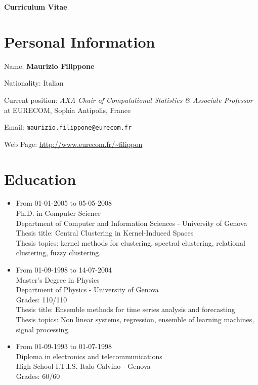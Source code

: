 \documentclass[a4paper,10pt]{article}
\begin{document}
\begin{center}
{\bf \LARGE Curriculum Vitae}
\end{center}

\section*{Personal Information}
\begin{description}
\item Name:               {\bf Maurizio Filippone}
\item Nationality:        Italian
\item Current position:
{\em AXA Chair of Computational Statistics \& Associate Professor} at EURECOM, Sophia Antipolis, France
\item Email:              \texttt{maurizio.filippone@eurecom.fr}
\item Web Page:           \url{http://www.eurecom.fr/~filippon}
\end{description}

\section*{Education}
\begin{itemize}
\item From 01-01-2005 to 05-05-2008 \\
Ph.D. in Computer Science \\
Department of Computer and Information Sciences - University of Genova \\
Thesis title: Central Clustering in Kernel-Induced Spaces \\
Thesis topics: kernel methods for clustering, spectral clustering, relational clustering, fuzzy clustering.

\item From 01-09-1998 to 14-07-2004  \\
Master's Degree in Physics  \\
Department of Physics - University of Genova \\
Grades: 110/110  \\
Thesis title: Ensemble methods for time series analysis and forecasting \\
Thesis topics: Non linear systems, regression, ensemble of learning machines, signal processing.

\item From 01-09-1993 to 01-07-1998  \\
Diploma in electronics and telecommunications \\
High School I.T.I.S. Italo Calvino - Genova \\
Grades: 60/60

\end{itemize}
\end{document}

